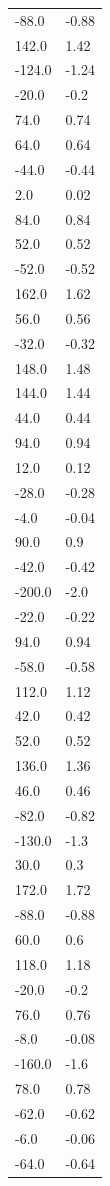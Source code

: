 \begin{longtable}{ll}
-88.0 & -0.88 \\
142.0 & 1.42 \\
-124.0 & -1.24 \\
-20.0 & -0.2 \\
74.0 & 0.74 \\
64.0 & 0.64 \\
-44.0 & -0.44 \\
2.0 & 0.02 \\
84.0 & 0.84 \\
52.0 & 0.52 \\
-52.0 & -0.52 \\
162.0 & 1.62 \\
56.0 & 0.56 \\
-32.0 & -0.32 \\
148.0 & 1.48 \\
144.0 & 1.44 \\
44.0 & 0.44 \\
94.0 & 0.94 \\
12.0 & 0.12 \\
-28.0 & -0.28 \\
-4.0 & -0.04 \\
90.0 & 0.9 \\
-42.0 & -0.42 \\
-200.0 & -2.0 \\
-22.0 & -0.22 \\
94.0 & 0.94 \\
-58.0 & -0.58 \\
112.0 & 1.12 \\
42.0 & 0.42 \\
52.0 & 0.52 \\
136.0 & 1.36 \\
46.0 & 0.46 \\
-82.0 & -0.82 \\
-130.0 & -1.3 \\
30.0 & 0.3 \\
172.0 & 1.72 \\
-88.0 & -0.88 \\
60.0 & 0.6 \\
118.0 & 1.18 \\
-20.0 & -0.2 \\
76.0 & 0.76 \\
-8.0 & -0.08 \\
-160.0 & -1.6 \\
78.0 & 0.78 \\
-62.0 & -0.62 \\
-6.0 & -0.06 \\
-64.0 & -0.64 \\

\end{longtable}
